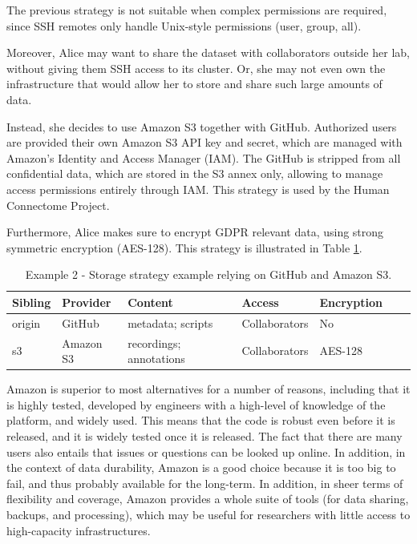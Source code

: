 \documentclass[smallextended]{svjour3}       %
\makeatletter
\newcommand\footnoteref[1]{\protected@xdef\@thefnmark{\ref{#1}}\@footnotemark}
\makeatother
\begin{document}
The previous strategy is not suitable when complex permissions are required, since SSH remotes only handle Unix-style permissions (user, group, all).

Moreover, Alice may want to share the dataset with collaborators outside her lab, without giving them SSH access to its cluster. Or, she may not even own the infrastructure that would allow her to store and share such large amounts of data. 

Instead, she decides to use Amazon S3 together with GitHub. Authorized users are provided their own Amazon S3 API key and secret, which are managed with Amazon's Identity and Access Manager (IAM). The GitHub is stripped from all confidential data, which are stored in the S3 annex only, allowing to manage access permissions entirely through IAM. This strategy is used by the Human Connectome Project\footnoteref{note:hcp}.

Furthermore, Alice makes sure to encrypt GDPR relevant data, using strong symmetric encryption (AES-128). This strategy is illustrated in Table \ref{table:storage2}.

\begin{table}[!htbp]
\centering
\begin{tabular}{@{}lllllll@{}}
\toprule
\textbf{Sibling} & \textbf{Provider} & \textbf{Content} & \textbf{Access} & \textbf{Encryption} \\ \midrule
origin   & GitHub     & metadata; scripts & Collaborators & No  \\
s3 & Amazon S3  &  recordings; annotations  & Collaborators  & AES-128 \\ \bottomrule
\end{tabular}
\caption{\label{table:storage2}Example 2 - Storage strategy example relying on GitHub and Amazon S3.}
\end{table}

Amazon is superior to most alternatives for a number of reasons, including that it is highly tested, developed by engineers with a high-level of knowledge of the platform, and widely used. This means that the code is robust even before it is released, and it is widely tested once it is released. The fact that there are many users also entails that issues or questions can be looked up online. In addition, in the context of data durability, Amazon is a good choice because it is too big to fail, and thus probably available for the long-term. In addition, in sheer terms of flexibility and coverage, Amazon provides a whole suite of tools (for data sharing, backups, and processing), which may be useful for researchers with little access to high-capacity infrastructures.
\end{document}
